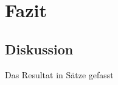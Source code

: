 \documentclass{../template/ffhsthesis}
\begin{document}



\chapter{Fazit}
\section{Diskussion}
Das Resultat in Sätze gefasst








\listoffigures
\end{document}
